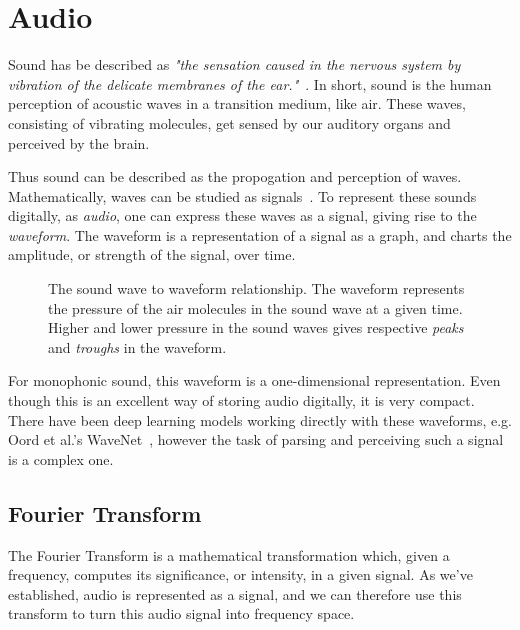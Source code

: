 \section{Audio}

Sound has be described as \textit{"the sensation caused in the nervous system by vibration of the delicate membranes of the ear."}~\cite{1953fundamentals}. In short, sound is the human perception of acoustic waves in a transition medium, like air. These waves, consisting of vibrating molecules, get sensed by our auditory organs and perceived by the brain. 

Thus sound can be described as the propogation and perception of waves. Mathematically, waves can be studied as signals~\cite{8454362}. To represent these sounds digitally, as \textit{audio}, one can express these waves as a signal, giving rise to the \textit{waveform}. The waveform is a representation of a signal as a graph, and charts the amplitude, or strength of the signal, over time.

\begin{figure}[H]
    \centering
    
    \caption{The sound wave to waveform relationship. The waveform represents the pressure of the air molecules in the sound wave at a given time. Higher and lower pressure in the sound waves gives respective \textit{peaks} and \textit{troughs} in the waveform.}
    \label{WaveformFigure}
\end{figure}

For monophonic sound, this waveform is a one-dimensional representation. Even though this is an excellent way of storing audio digitally, it is very compact. There have been deep learning models working directly with these waveforms, e.g. Oord et al.'s WaveNet~\cite{oord2016wavenetgenerativemodelraw}, however the task of parsing and perceiving such a signal is a complex one.

\subsection{Fourier Transform}

The Fourier Transform is a mathematical transformation which, given a frequency, computes its significance, or intensity, in a given signal. As we've established, audio is represented as a signal, and we can therefore use this transform to turn this audio signal into frequency space. 


